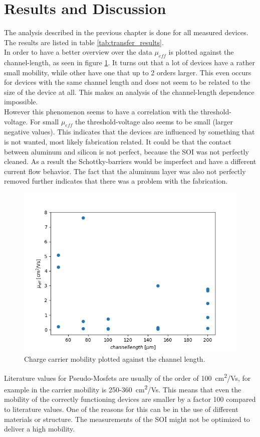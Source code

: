 \documentclass[%
 reprint,
amsmath,amssymb,
pra,
]{revtex4-1}
\begin{document}
\section{Results and Discussion}
The analysis described in the previous chapter is done for all measured devices. The results are listed in table \ref{tab:transfer_results}.\\
In order to have a better overview over the data $\mu_{eff}$ is plotted against the channel-length, as seen in figure \ref{fig:plot}. It turns out that a lot of devices have a rather small mobility, while other have one that up to 2 orders larger. This even occurs for devices with the same channel length and does not seem to be related to the size of the device at all. This makes an analysis of the channel-length dependence impossible.\\
However this phenomenon seems to have a correlation with the threshold- voltage. For small $\mu_{eff}$ the threshold-voltage also seems to be small (larger negative values). This indicates that the devices are influenced by something that is not wanted, most likely fabrication related. It could be that the contact between aluminum and silicon is not perfect, because the SOI was not perfectly cleaned. As a result the Schottky-barriers would be imperfect and have a different current flow behavior. The fact that the aluminum layer was also not perfectly removed further indicates that there was a problem with the fabrication.
\begin{figure}[b]
\centering
\includegraphics[scale=0.55]{Bilder/figure_1.png}
\caption{Charge carrier mobility plotted against the channel length.}
\label{fig:plot}
\end{figure}
Literature values for Pseudo-Mosfets are usually of the order of \SI{100}{cm^2/Vs}, for example in \cite{Loss98} the carrier mobility is 250-\SI{360}{cm^2/Vs}. This means that even the mobility of the correctly functioning devices are smaller by a factor 100 compared to literature values. One of the reasons for this can be in the use of different materials or structure. The measurements of the SOI might not be optimized to deliver a high mobility.\\
\end{document}
